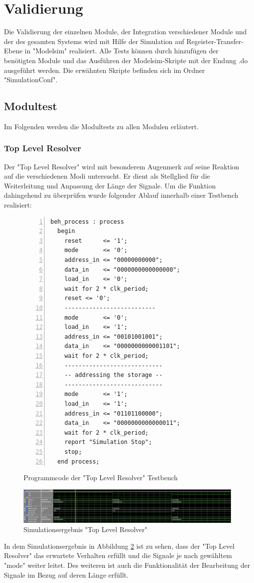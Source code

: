 \documentclass{article}
\numberwithin{equation}{section}
\begin{document}
\section{Validierung}
Die Validierung der einzelnen Module, der Integration verschiedener Module und der
des gesamten Systems wird mit Hilfe der Simulation auf Regeister-Transfer-Ebene 
in "Modelsim" realisiert. Alle Tests können durch hinzufügen der benötigten Module 
und das Ausführen der Modelsim-Skripte mit der Endung .do ausgeführt werden.
Die erwähnten Skripte befinden sich im Ordner "SimulationConf".
\subsection{Modultest}
Im Folgenden werden die Modultests zu allen Modulen erläutert.
\subsubsection{Top Level Resolver}
Der "Top Level Resolver" wird mit besonderem Augenmerk auf seine Reaktion auf die
verschiedenen Modi untersucht. Er dient als Stellglied für die Weiterleitung und
Anpassung der Länge der Signale. Um die Funktion dahingehend zu überprüfen wurde 
folgender Ablauf innerhalb einer Testbench realisiert:
\begin{figure}[htbp]
\begin{lstlisting}[style=VHDL,numbers=left,stepnumber=1,style=myCustomMatlabStyle,basicstyle=\footnotesize]
beh_process : process
  begin
    reset      <= '1';
    mode       <= '0';
    address_in <= "00000000000";
    data_in    <= "0000000000000000";
    load_in    <= '0';
    wait for 2 * clk_period;
    reset <= '0';
    --------------------------
    mode       <= '0';
    load_in    <= '1';
    address_in <= "00101001001";
    data_in    <= "0000000000001101";
    wait for 2 * clk_period;
    ----------------------------
    -- addressing the storage --
    ----------------------------
    mode       <= '1';
    load_in    <= '1';
    address_in <= "01101100000";
    data_in    <= "0000000000000011";
    wait for 2 * clk_period;
    report "Simulation Stop";
    stop;
  end process;
\end{lstlisting}
\caption{Programmcode der "Top Level Resolver" Testbench} \label{code:tlr_testbench}
\end{figure}
\begin{figure}[htb!]
    \begin{center}
      \includegraphics[width=15cm]{SimulationPictures/top_level_resolver_sim.png}
    \end{center}
    \caption{Simulationsergebnis "Top Level Resolver"} \label{fig:tlr_sim}
  \end{figure}
\FloatBarrier
In dem Simulationsergebnis in Abbildung \ref{fig:tlr_sim} ist zu sehen, dass der 
"Top Level Resolver" das erwartete Verhalten erfüllt und die Signale je nach gewähltem 
"mode" weiter leitet. Des weiteren ist auch die Funktionalität der Bearbeitung der 
Signale im Bezug auf deren Länge erfüllt.
\pagebreak
\end{document}
